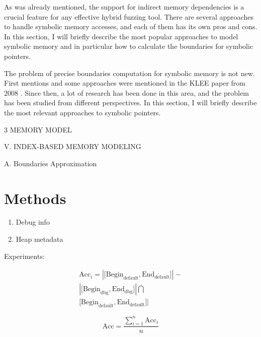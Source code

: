 \documentclass[conference]{IEEEtran}
\begin{document}
As was already mentioned, the support for indirect memory dependencies is a crucial feature for any effective hybrid fuzzing tool. There are several approaches to handle symbolic memory accesses, and each of them has its own pros and cons. In this section, I will briefly describe the most popular approaches to model symbolic memory and in particular how to calculate the boundaries for symbolic pointers.

The problem of precise boundaries computation for symbolic memory is not new. First mentions and some approaches were mentioned in the KLEE paper from 2008 \cite{symbolic-pointers-reasoning}. Since then, a lot of research has been done in this area, and the problem has been studied from different perspectives. In this section, I will briefly describe the most relevant approaches to symbolic pointers.

3 MEMORY MODEL \cite{a-survey-of-symbolic-execution-techniques}

V. INDEX-BASED MEMORY MODELING \cite{unleashing-mayhem-on-binary-code}

A. Boundaries Approximation \cite{symbolic-pointers-reasoning}

\cite{KLEE-OSDI-2008}


\section{Methods}

\begin{enumerate}
    \item Debug info
    \item Heap metadata
\end{enumerate}

Experiments:

\begin{equation*}
    \begin{aligned}
        \text{Acc}_i= | \lbrack \text{Begin}_\text{default}, \text{End}_\text{default} \rbrack | - \\
        {|\lbrack \text{Begin}_\text{dbg}, \text{End}_\text{dbg}\rbrack|} \bigcap                  \\
        {\lbrack \text{Begin}_\text{default}, \text{End}_\text{default} \rbrack|}
    \end{aligned}
\end{equation*}

\begin{equation}
    \text{Acc}=\frac{\sum_{i=1}^n{\text{Acc}_i}}{n}
\end{equation}
\end{document}
